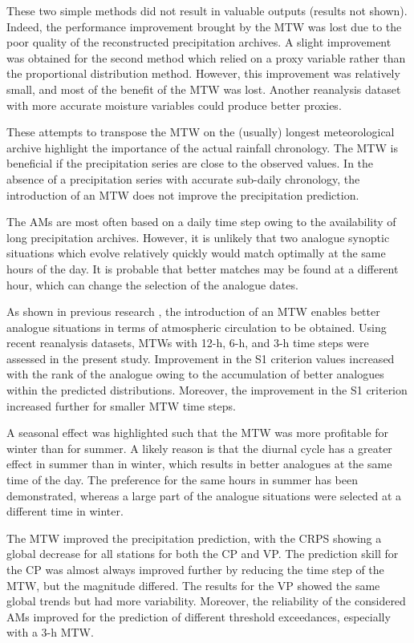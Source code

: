 \documentclass[hess, manuscript]{copernicus}
\begin{document}
	These two simple methods did not result in valuable outputs (results not shown). Indeed, the performance improvement brought by the MTW was lost due to the poor quality of the reconstructed precipitation archives. A slight improvement was obtained for the second method which relied on a proxy variable rather than the proportional distribution method. However, this  improvement was relatively small, and most of the benefit of the MTW was lost. Another reanalysis dataset with more accurate moisture variables could produce better proxies.
	
	These attempts to transpose the MTW on the (usually) longest meteorological archive highlight the importance of the actual rainfall chronology. The MTW is beneficial if the precipitation series are close to the observed values. In the absence of a precipitation series with accurate sub-daily chronology, the introduction of an MTW does not improve the precipitation prediction.
	
	
	\conclusions  %
	\label{sec:conclusions}
	
	The AMs are most often based on a daily time step owing to the availability of long precipitation archives. However, it is unlikely that two analogue synoptic situations which evolve relatively quickly would match optimally at the same hours of the day. It is probable that better matches may be found at a different hour, which can change the selection of the analogue dates.
	
	As shown in previous research \citep{Finet2008}, the introduction of an MTW enables better analogue situations in terms of atmospheric circulation to be obtained. Using recent reanalysis datasets, MTWs with 12-h, 6-h, and 3-h time steps were assessed in the present study. Improvement in the S1 criterion values increased with the rank of the analogue owing to the accumulation of better analogues within the predicted distributions. Moreover, the improvement in the S1 criterion increased further for smaller MTW time steps.
	
	A seasonal effect was highlighted such that the MTW was more profitable for winter than for summer. A likely reason is that the diurnal cycle has a greater effect in summer than in winter, which results in better analogues at the same time of the day. The preference for the same hours in summer has been demonstrated, whereas a large part of the analogue situations were selected at a different time in winter.
	
	The MTW improved the precipitation prediction, with the CRPS showing a global decrease for all stations for both the CP and VP. The prediction skill for the CP was almost always improved further by reducing the time step of the MTW, but the magnitude differed. The results for the VP showed the same global trends but had more variability. Moreover, the reliability of the considered AMs improved for the prediction of different threshold exceedances, especially with a 3-h MTW.
	
\end{document}
